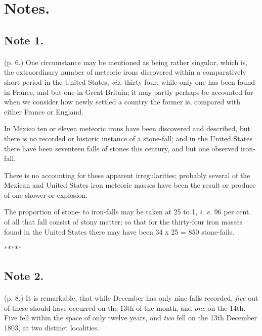 \documentclass[a4paper, 12pt, oneside]{article}
\begin{document}
\section{Notes.}
\subsection{Note 1.}
\paragraph{}
(p. 6.) One circumstance may be mentioned as being rather singular, which is, the extraordinary number of meteoric irons discovered within a comparatively short period in the United States, \emph{viz.} thirty-four; while only one has been found in France, and but one in Great Britain; it may partly perhaps be accounted for when we consider how newly settled a country the former is, compared with either France or England.

In Mexico ten or eleven meteoric irons have been discovered and described, but there is no recorded or historic instance of a stone-fall; and in the United States there have been seventeen falls of stones this century, and but one observed iron-fall.

There is no accounting for these apparent irregularities; probably several of the Mexican and United States iron meteoric masses have been the result or produce of one shower or explosion.

The proportion of stone- to iron-falls may be taken at 25 to 1, \emph{i. e.} 96 per cent. of all that fall consist of stony matter; so that for the thirty-four iron masses found in the United States there may have been 34 x 25 = 850 stone-fails.

\centerline{*\hspace{15mm}*\hspace{15mm}*\hspace{15mm}*\hspace{15mm}*}
\bigskip

\subsection{Note 2.}
\paragraph{}
(p. 8.) It is remarkable, that while December has only nine falls recorded, \emph{five} out of these should have occurred on the 13th of the month, and \emph{one} on the 14th. Five fell within the space of only twelve years, and \emph{two} fell on the 13th December 1803, at two distinct localities.
\end{document}
